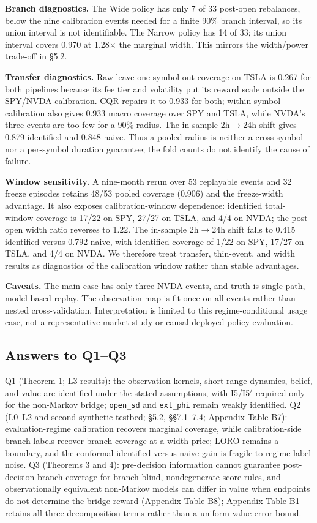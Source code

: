 \textbf{Branch diagnostics.} The Wide policy has only 7 of 33 post-open rebalances, below the nine calibration events needed for a finite 90\% branch interval, so its union interval is not identifiable. The Narrow policy has 14 of 33; its union interval covers 0.970 at 1.28$\times$ the marginal width. This mirrors the width/power trade-off in \S5.2.

\textbf{Transfer diagnostics.} Raw leave-one-symbol-out coverage on TSLA is 0.267 for both pipelines because its fee tier and volatility put its reward scale outside the SPY/NVDA calibration. CQR repairs it to 0.933 for both; within-symbol calibration also gives 0.933 macro coverage over SPY and TSLA, while NVDA's three events are too few for a 90\% radius. The in-sample 2h$\to$24h shift gives 0.879 identified and 0.848 naive. Thus a pooled radius is neither a cross-symbol nor a per-symbol duration guarantee; the fold counts do not identify the cause of failure.

\textbf{Window sensitivity.} A nine-month rerun over 53 replayable events and 32 freeze episodes retains 48/53 pooled coverage (0.906) and the freeze-width advantage. It also exposes calibration-window dependence: identified total-window coverage is 17/22 on SPY, 27/27 on TSLA, and 4/4 on NVDA; the post-open width ratio reverses to 1.22. The in-sample 2h$\to$24h shift falls to 0.415 identified versus 0.792 naive, with identified coverage of 1/22 on SPY, 17/27 on TSLA, and 4/4 on NVDA. We therefore treat transfer, thin-event, and width results as diagnostics of the calibration window rather than stable advantages.

\textbf{Caveats.} The main case has only three NVDA events, and truth is single-path, model-based replay. The observation map is fit once on all events rather than nested cross-validation. Interpretation is limited to this regime-conditional usage case, not a representative market study or causal deployed-policy evaluation.

\subsection{Answers to Q1--Q3}

Q1 (Theorem 1; L3 results): the observation kernels, short-range dynamics, belief, and value are identified under the stated assumptions, with I5/I5$'$ required only for the non-Markov bridge; \texttt{open\_sd} and \texttt{ext\_phi} remain weakly identified. Q2 (L0--L2 and second synthetic testbed; \S5.2, \S\S7.1--7.4; Appendix Table B7): evaluation-regime calibration recovers marginal coverage, while calibration-side branch labels recover branch coverage at a width price; LORO remains a boundary, and the conformal identified-versus-naive gain is fragile to regime-label noise. Q3 (Theorems 3 and 4): pre-decision information cannot guarantee post-decision branch coverage for branch-blind, nondegenerate score rules, and observationally equivalent non-Markov models can differ in value when endpoints do not determine the bridge reward (Appendix Table B8); Appendix Table B1 retains all three decomposition terms rather than a uniform value-error bound.

